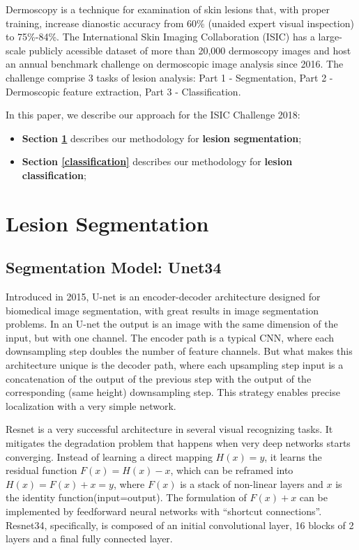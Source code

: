 \documentclass[conference]{IEEEtran}
\begin{document}
Dermoscopy is a technique for examination of skin lesions that, with proper training, increase dianostic accuracy from 60\% (unaided expert visual inspection) to 75\%-84\%\cite{isic}. The International Skin Imaging Collaboration (ISIC) has a large-scale publicly acessible dataset of more than 20,000 dermoscopy images and host an annual benchmark challenge on dermoscopic image analysis since 2016.  The challenge comprise 3 tasks of lesion analysis: Part 1 - Segmentation, Part 2 - Dermoscopic feature extraction, Part 3 - Classification. 

In this paper, we describe our approach for the ISIC Challenge 2018:
\begin{itemize}
\item \textbf{Section \ref{segmentation}} describes our methodology for \textbf{lesion segmentation};
\item \textbf{Section \ref{classification}} describes our methodology for \textbf{lesion classification};
\end{itemize}


\section{Lesion Segmentation}
\label{segmentation}


\subsection{Segmentation Model: Unet34}
Introduced in 2015, U-net is an encoder-decoder architecture designed for biomedical image segmentation\cite{olaf}, with great results in image segmentation problems\cite{iglovikov}. In an U-net the output is an image with the same dimension of the input, but with one channel.  The encoder path is a typical CNN, where each downsampling step doubles the number of feature channels. But what makes this architecture unique is the decoder path, where each upsampling step input is a concatenation of the output of the previous step with the output of the corresponding (same height) downsampling step. This strategy enables precise localization with a very simple network. 

Resnet is a very successful architecture in several visual recognizing tasks\cite{he}. It mitigates the degradation problem that happens when very deep networks starts converging. Instead of learning a direct mapping $H(x) = y$, it learns the residual function  $F(x) = H(x)-x$, which can be reframed into $H(x) = F(x)+x = y$, where $F(x)$ is a stack of non-linear layers and $x$ is the identity function(input=output). The formulation of $F(x)+x$ can be implemented by feedforward neural networks with “shortcut connections”. Resnet34, specifically, is composed of an initial convolutional layer, 16 blocks of 2 layers and a final fully connected layer.
\end{document}
